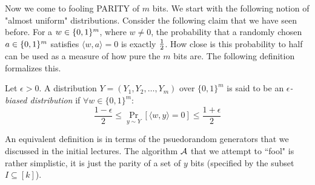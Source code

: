 Now we come to fooling {\sc PARITY} of $m$ bits. We start with the following notion of "almost uniform" distributions. Consider the following claim that we have seen before. For a $w \in \{0,1\}^m$, where $w \ne 0$, the probability that a randomly chosen $a \in \{0,1\}^m$ satisfies $\langle
w,a \rangle = 0$ is exactly $\frac{1}{2}$. How close is this probability to half can be used as a measure of how pure the $m$ bits are. The following definition formalizes this.
\begin{definition}
Let $\epsilon > 0$. A distribution $Y = (Y_1,Y_2, \ldots, Y_m)$ over $\{0,1\}^m$ is said to be an \textit{$\epsilon$-biased distribution }if $\forall w \in \{0,1\}^m$:
$$\frac{1-\epsilon}{2} \le \Pr_{y \sim Y}\left[ \langle w,y \rangle = 0 \right] \le \frac{1+\epsilon}{2}$$
\end{definition}
\noindent An equivalent definition is in terms of the psuedorandom generators that we discussed in the initial lectures. The algorithm ${\cal A}$ that we attempt to ``fool" is rather simplistic, it is just the parity of a set of $y$ bits (specified by the subset $I \subseteq [k]$). 


